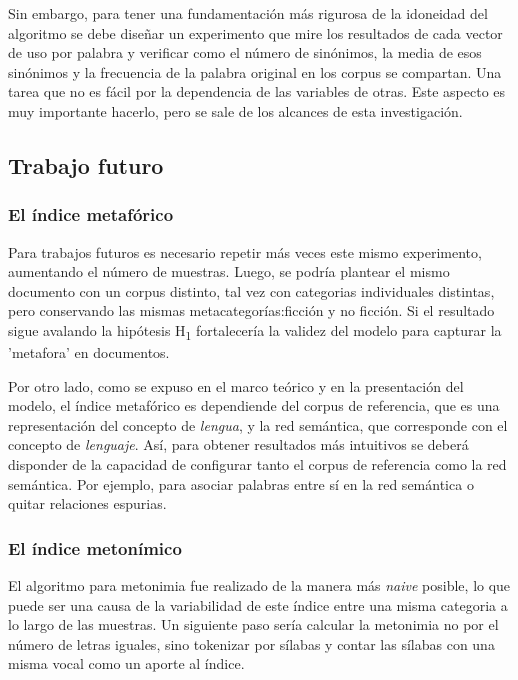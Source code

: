 \documentclass[12pt,letterpaper,twoside]{article}
\begin{document}
Sin embargo, para tener una fundamentación más rigurosa de la
idoneidad del algoritmo se debe diseñar un experimento que mire los
resultados de cada vector de uso por palabra y verificar como el
número de sinónimos, la media de esos sinónimos y la frecuencia de la
palabra original en los corpus se compartan. Una tarea que no es fácil
por la dependencia de las variables de otras. Este aspecto es muy
importante hacerlo, pero se sale de los alcances de esta
investigación.



\subsection{Trabajo futuro}
\label{sec:orgaa27fcf}

\subsubsection{El índice metafórico}
\label{sec:org3c49794}
Para trabajos futuros es necesario repetir más veces este mismo experimento, aumentando el número de muestras.
Luego, se podría plantear el mismo documento con un corpus distinto, tal vez con categorias individuales
distintas, pero conservando las mismas metacategorías:ficción y no ficción. Si el resultado sigue
avalando la hipótesis H\textsubscript{1} fortalecería la validez del modelo para capturar la 'metafora' en documentos.

Por otro lado, como se expuso en el marco teórico y en la presentación del modelo, el índice metafórico
es dependiende del corpus de referencia, que es una representación del concepto de \emph{lengua}, y la
red semántica, que corresponde con el concepto de \emph{lenguaje}. Así, para obtener resultados más
intuitivos se deberá disponder de la capacidad de configurar tanto el corpus de referencia como la
red semántica. Por ejemplo, para asociar palabras entre sí en la red semántica o quitar relaciones
espurias.


\subsubsection{El índice metonímico}
\label{sec:org99bb9cf}

El algoritmo para metonimia fue realizado de la manera más \emph{naive} posible, lo que puede ser una causa
de la variabilidad de este índice entre una misma categoria a lo largo de las muestras. Un siguiente
paso sería calcular la metonimia no por el número de letras iguales, sino tokenizar por sílabas y contar
las sílabas con una misma vocal como un aporte al índice.
\end{document}
